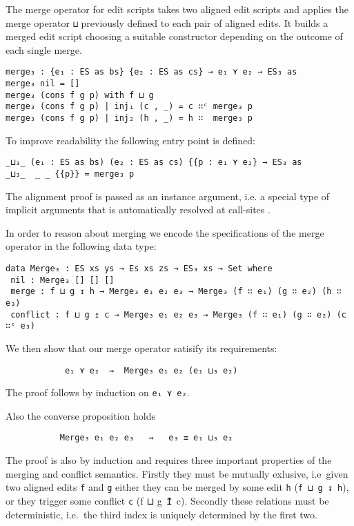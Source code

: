 \documentclass[preprint]{sigplanconf}
\begin{document}
	The merge operator for edit scripts takes two aligned edit scripts and
	applies the merge operator \texttt{⊔} previously defined to
	each pair of aligned edits. It builds a merged edit script choosing a 
	suitable constructor depending on the outcome of each single merge.

\begin{verbatim}
merge₃ : {e₁ : ES as bs} {e₂ : ES as cs} → e₁ ⋎ e₂ → ES₃ as
merge₃ nil = []
merge₃ (cons f g p) with f ⊔ g
merge₃ (cons f g p) | inj₁ (c , _) = c ∷ᶜ merge₃ p
merge₃ (cons f g p) | inj₂ (h , _) = h ∷  merge₃ p
\end{verbatim}
	To improve readability the following entry point is defined:
\begin{verbatim}
_⊔₃_ (e₁ : ES as bs) (e₂ : ES as cs) {{p : e₁ ⋎ e₂} → ES₃ as
_⊔₃_  _ _ {{p}} = merge₃ p
\end{verbatim}
	The alignment proof is passed as an instance argument, i.e. a special type 
	of implicit arguments that is automatically resolved at call-sites 
	\cite{Devriese11}.

        In order to reason about merging we encode the specifications of
        the merge operator in the following data type:
\begin{verbatim}
data Merge₃ : ES xs ys → Es xs zs → ES₃ xs → Set where
 nil : Merge₃ [] [] []
 merge : f ⊔ g ↧ h → Merge₃ e₁ e₂ e₃ → Merge₃ (f ∷ e₁) (g ∷ e₂) (h ∷ e₃)
 conflict : f ⊔ g ↥ c → Merge₃ e₁ e₂ e₃ → Merge₃ (f ∷ e₁) (g ∷ e₂) (c ∷ᶜ e₃)
\end{verbatim}
        We then show that our merge operator satisify its requirements:
\begin{verbatim}
            e₁ ⋎ e₂  ⇒  Merge₃ e₁ e₂ (e₁ ⊔₃ e₂)
\end{verbatim}
        The proof follows by induction on \texttt{e₁ ⋎ e₂}.

        Also the converse proposition holds
\begin{verbatim}
           Merge₃ e₁ e₂ e₃   ⇒   e₃ ≡ e₁ ⊔₃ e₂
\end{verbatim}
        The proof is also by induction and requires three important properties of
        the merging and conflict semantics.
        Firstly they must be mutually exlusive, i.e\ given
        two aligned edits \texttt{f} and \texttt{g} either they can be merged by
        some edit \texttt{h} (\texttt{f ⊔ g ↧ h}), or they trigger some conflict
        \texttt{c} (f ⊔ g ↥ c). Secondly these relations must be deterministic, i.e.\
        the third index is uniquely determined by the first two.
        
\end{document}
